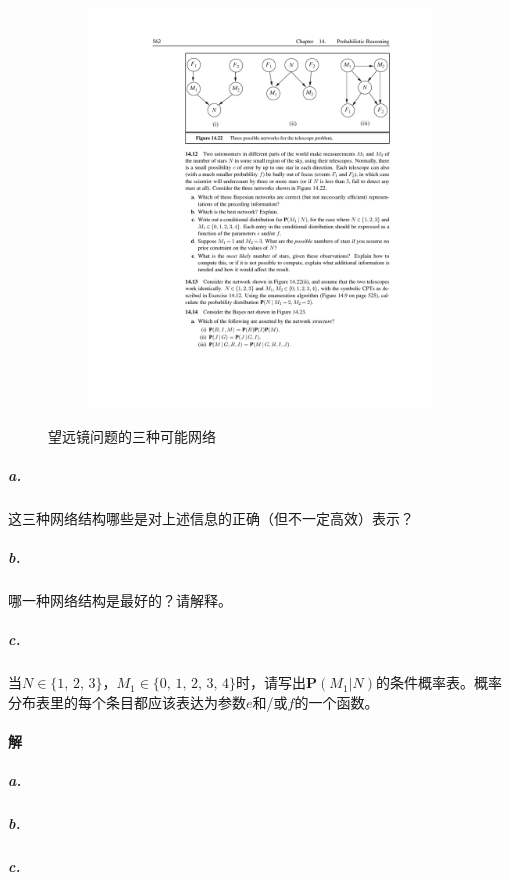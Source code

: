 \documentclass{article}
\begin{document}
\begin{figure}
\begin{subfigure}[t]{0.3\textwidth}
        \includegraphics[scale = 0.6]{Figure/14-22(iii).pdf}
        \caption{}
        \label{14.22(iii)}
    \end{subfigure}
    \caption{望远镜问题的三种可能网络}
    \label{14.22}
\end{figure}
\subparagraph{a.} 这三种网络结构哪些是对上述信息的正确（但不一定高效）表示？
\subparagraph{b.} 哪一种网络结构是最好的？请解释。
\subparagraph{c.} 当$N \in \{1,\, 2,\, 3\}$，$M_1 \in \{0,\, 1,\, 2,\, 3,\, 4\}$时，请写出$\mathbf{P}(M_1 | N)$的条件概率表。概率分布表里的每个条目都应该表达为参数$e$和/或$f$的一个函数。

\paragraph{解}
\subparagraph{a.}
\subparagraph{b.}
\subparagraph{c.}
\end{document}
